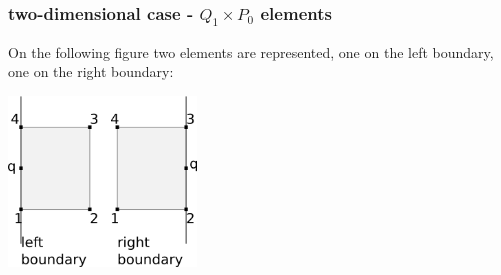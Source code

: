 \subsubsection{two-dimensional case - $Q_1 \times P_0$ elements}

On the following figure two elements are represented, one on the 
left boundary, one on the right boundary:
\begin{center}
\includegraphics[width=5cm]{images/openbc/drawing.png}
\end{center}

